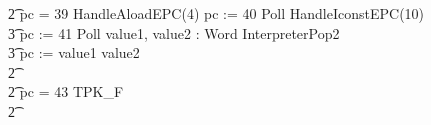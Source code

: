 \begin{figure}[t]
\begin{circus}
    \t2 {} \circelse pc = 39 \circthen HandleAloadEPC(4) \circseq pc := 40 \circseq Poll \circseq HandleIconstEPC(10) \circseq \\
    \t3 pc := 41 \circseq Poll \circseq \circvar value1, value2 : Word \circspot InterpreterPop2 \circseq \\
    \t3 pc := \IF value1 \leq value2   \\
    \t2 {} \cdots {} \\
    \t2 {} \circelse pc = 43 \circthen TPK\_F \\
    \t2 {} \cdots {} \\

\end{circus}
\end{figure}
